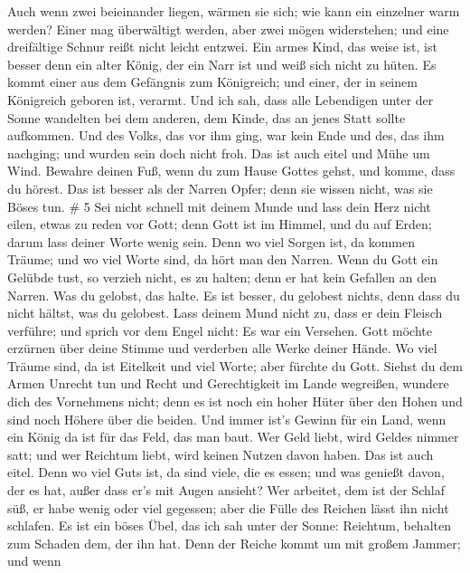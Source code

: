  Auch wenn zwei beieinander liegen, wärmen sie sich; wie
kann ein einzelner warm werden?  Einer mag überwältigt
werden, aber zwei mögen widerstehen; und eine dreifältige Schnur reißt
nicht leicht entzwei.  Ein armes Kind, das weise ist, ist
besser denn ein alter König, der ein Narr ist und weiß sich nicht zu
hüten.  Es kommt einer aus dem Gefängnis zum Königreich;
und einer, der in seinem Königreich geboren ist, verarmt. 
Und ich sah, dass alle Lebendigen unter der Sonne wandelten bei dem
anderen, dem Kinde, das an jenes Statt sollte aufkommen. 
Und des Volks, das vor ihm ging, war kein Ende und des, das ihm
nachging; und wurden sein doch nicht froh. Das ist auch eitel und Mühe
um Wind.  Bewahre deinen Fuß, wenn du zum Hause Gottes
gehst, und komme, dass du hörest. Das ist besser als der Narren Opfer;
denn sie wissen nicht, was sie Böses tun. \# 5  Sei nicht
schnell mit deinem Munde und lass dein Herz nicht eilen, etwas zu reden
vor Gott; denn Gott ist im Himmel, und du auf Erden; darum lass deiner
Worte wenig sein.  Denn wo viel Sorgen ist, da kommen
Träume; und wo viel Worte sind, da hört man den Narren. 
Wenn du Gott ein Gelübde tust, so verzieh nicht, es zu halten; denn er
hat kein Gefallen an den Narren. Was du gelobst, das halte. 
Es ist besser, du gelobest nichts, denn dass du nicht hältst, was du
gelobest.  Lass deinem Mund nicht zu, dass er dein Fleisch
verführe; und sprich vor dem Engel nicht: Es war ein Versehen. Gott
möchte erzürnen über deine Stimme und verderben alle Werke deiner Hände.
 Wo viel Träume sind, da ist Eitelkeit und viel Worte; aber
fürchte du Gott.  Siehst du dem Armen Unrecht tun und Recht
und Gerechtigkeit im Lande wegreißen, wundere dich des Vornehmens nicht;
denn es ist noch ein hoher Hüter über den Hohen und sind noch Höhere
über die beiden.  Und immer ist's Gewinn für ein Land, wenn
ein König da ist für das Feld, das man baut.  Wer Geld
liebt, wird Geldes nimmer satt; und wer Reichtum liebt, wird keinen
Nutzen davon haben. Das ist auch eitel.  Denn wo viel Guts
ist, da sind viele, die es essen; und was genießt davon, der es hat,
außer dass er's mit Augen ansieht?  Wer arbeitet, dem ist
der Schlaf süß, er habe wenig oder viel gegessen; aber die Fülle des
Reichen lässt ihn nicht schlafen.  Es ist ein böses Übel,
das ich sah unter der Sonne: Reichtum, behalten zum Schaden dem, der ihn
hat.  Denn der Reiche kommt um mit großem Jammer; und wenn
